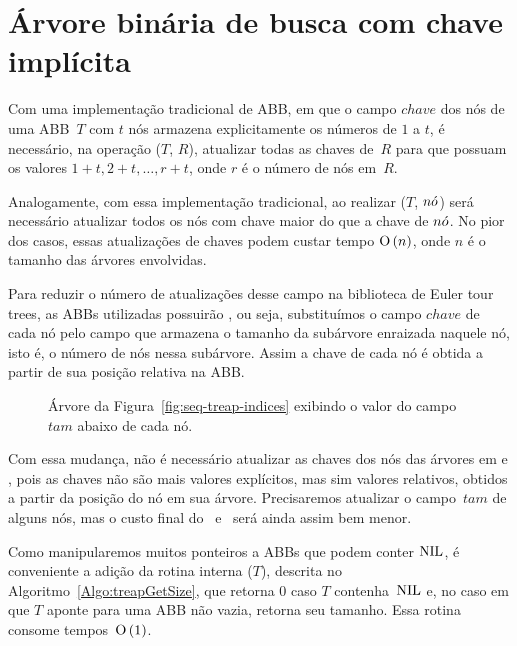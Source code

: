 \chapter{Árvore binária de busca com chave implícita}
\label{sec:TreapDeChaveImplicita}

Com uma implementação tradicional de ABB, em que o campo $chave$ dos nós de uma ABB~$T$ com $t$ nós armazena explicitamente os números de $1$ a $t$, é necessário, na operação \treapJoin($T$, $R$), atualizar todas as chaves de~$R$ para que possuam os valores $1+t,2+t, \ldots, r+t$, onde $r$ é o número de nós em~$R$.

Analogamente, com essa implementação tradicional, ao realizar \treapSplit($T$, $n\acute{o}$) será necessário atualizar todos os nós com chave maior do que a chave de $n\acute{o}$. No pior dos casos, essas atualizações de chaves podem custar tempo $\text{O}\left(n\right)$, onde $n$ é o tamanho das árvores envolvidas.

Para reduzir o número de atualizações desse campo na biblioteca de Euler tour trees, as ABBs utilizadas possuirão , ou seja, substituímos o campo $chave$ de cada nó pelo campo  que armazena o tamanho da subárvore enraizada naquele nó, isto é, o número de nós nessa subárvore. Assim a chave de cada nó é obtida a partir de sua posição relativa na ABB.

\begin{figure}[htb]
\centering

\caption{Árvore da Figura~\ref{fig:seq-treap-indices} exibindo o valor do campo $tam$ abaixo de cada nó.}
\label{fig:seq-treap-size}
\end{figure}

Com essa mudança, não é necessário atualizar as chaves dos nós das árvores em \treapJoin{} e \treapSplit{}, pois as chaves não são mais valores explícitos, mas sim valores relativos, obtidos a partir da posição do nó em sua árvore.  Precisaremos atualizar o campo~$tam$ de alguns nós, mas o custo final do~\treapJoin{} e~\treapSplit{} será ainda assim bem menor.

Como manipularemos muitos ponteiros a ABBs que podem conter $\text{NIL}$, é conveniente a adição da rotina interna \treapGetSize($T$), descrita no Algoritmo~\ref{Algo:treapGetSize}, que retorna $0$ caso $T$ contenha~$\text{NIL}$ e, no caso em que $T$ aponte para uma ABB não vazia, retorna seu tamanho. Essa rotina consome tempos~$\text{O}\left(1\right)$.

